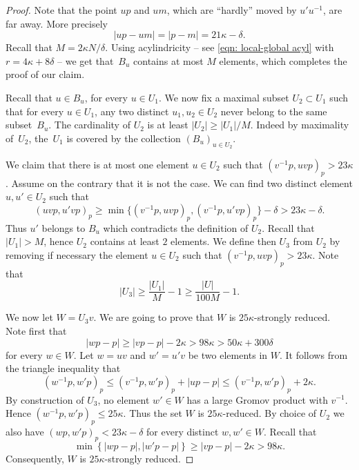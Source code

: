 \begin{proof}
Note that the point $up$ and $um$, which are ``hardly'' moved by $u'u^{-1}$, are far away.
More precisely
\begin{equation*}
|up- um| = |p - m|= 21\kappa - \delta.
\end{equation*}
Recall that $M = 2\kappa N /\delta$.
Using acylindricity -- see \eqref{eqn: local-global acyl} with $r = 4\kappa + 8\delta$ -- we get that~$B_u$ contains at most $M$ elements, which completes the proof of our claim.

Recall that $u \in B_u$, for every $u \in U_1$.
We now fix a maximal subset $U_2 \subset U_1$ such that for every $u \in U_1$, any two distinct $u_1, u_2 \in U_2$ never belong to the same subset~$B_u$.
The cardinality of $U_2$ is at least $|U_2| \geq |U_1|/M$.
Indeed by maximality of~$U_2$, the~$U_1$ is covered by the collection $(B_u)_{u \in U_2}$.

We claim that there is at most one element $u \in U_2$ such that $(v^{-1}p, uvp)_p > 23\kappa$.
Assume on the contrary that it is not the case.
We can find two distinct element $u,u' \in U_2$ such that
\begin{equation*}
(uvp,u'vp)_p \geq \min\{ (v^{-1}p, uvp)_p, (v^{-1}p, u'vp)_p\} - \delta > 23\kappa - \delta.
\end{equation*}
Thus $u'$ belongs to $B_u$ which contradicts the definition of $U_2$.
Recall that $|U_1| > M$, hence $U_2$ contains at least $2$ elements.
We define then $U_3$ from $U_2$ by removing if necessary the element $u \in U_2$ such that $(v^{-1}p, uvp)_p > 23\kappa$.
Note that
\begin{equation*}
|U_3| \geq \frac{|U_1|}M - 1 \geq \frac{|U|}{100M} - 1.
\end{equation*}

We now let $W = U_3v$.
We are going to prove that $W$ is $25\kappa$-strongly reduced.
Note first that
\begin{equation*}
|wp - p| \geq |vp - p| - 2\kappa > 98 \kappa > 50\kappa + 300\delta
\end{equation*}
for every $w \in W$.
Let $w = uv$ and $w' = u'v$ be two elements in $W$.
It follows from the triangle inequality that
\begin{equation*}
(w^{-1}p, w'p) _p \leq (v^{-1}p, w'p)_p + |up - p| \leq (v^{-1}p, w'p)_p + 2\kappa.
\end{equation*}
By construction of $U_3$, no element $w' \in W$ has a large Gromov product with $v^{-1}$.
Hence $(w^{-1}p, w'p) _p \leq 25\kappa$.
Thus the set $W$ is $25\kappa$-reduced.
By choice of $U_2$ we also have $(wp,w'p)_p < 23\kappa - \delta$ for every distinct $w,w' \in W$.
Recall that
\begin{equation*}
\min\left\{ |wp-p|, |w'p-p| \right\} \geq |vp - p| - 2\kappa > 98\kappa.
\end{equation*}
Consequently, $W$ is $25\kappa$-strongly reduced.
\end{proof}

